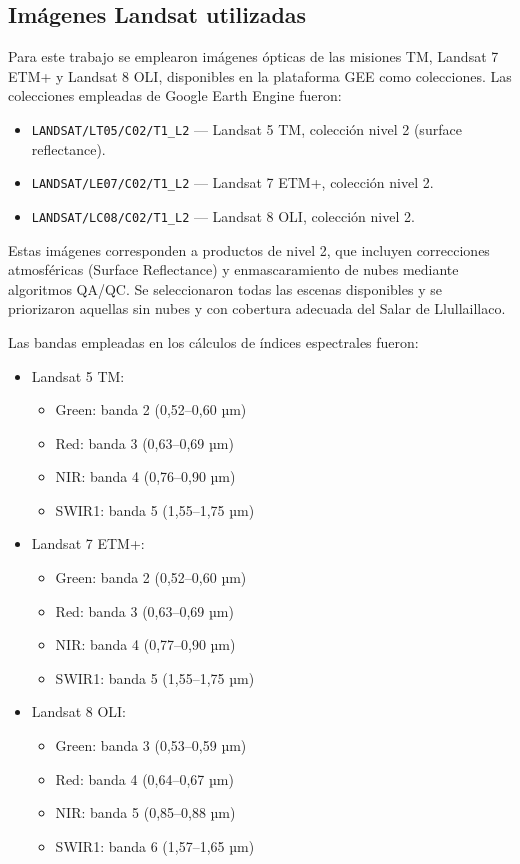 \subsection{Imágenes Landsat utilizadas}

Para este trabajo se emplearon imágenes ópticas de las misiones  TM, Landsat 7 ETM+ y Landsat 8 OLI, disponibles en la plataforma GEE como colecciones. Las colecciones empleadas de Google Earth Engine fueron:

\begin{itemize}
    \item \texttt{LANDSAT/LT05/C02/T1\_L2} — Landsat 5 TM, colección nivel 2 (surface reflectance).
    \item \texttt{LANDSAT/LE07/C02/T1\_L2} — Landsat 7 ETM+, colección nivel 2.
    \item \texttt{LANDSAT/LC08/C02/T1\_L2} — Landsat 8 OLI, colección nivel 2.
\end{itemize}

Estas imágenes corresponden a productos de nivel 2, que incluyen correcciones atmosféricas (Surface Reflectance) y enmascaramiento de nubes mediante algoritmos QA/QC. Se seleccionaron todas las escenas disponibles y se priorizaron aquellas sin nubes y con cobertura adecuada del Salar de Llullaillaco.

Las bandas empleadas en los cálculos de índices espectrales fueron:

\begin{itemize}
    \item Landsat 5 TM:
    \begin{itemize}
        \item Green: banda 2 (0,52–0,60 µm)
        \item Red: banda 3 (0,63–0,69 µm)
        \item NIR: banda 4 (0,76–0,90 µm)
        \item SWIR1: banda 5 (1,55–1,75 µm)
    \end{itemize}
    
    \item Landsat 7 ETM+:
    \begin{itemize}
        \item Green: banda 2 (0,52–0,60 µm)
        \item Red: banda 3 (0,63–0,69 µm)
        \item NIR: banda 4 (0,77–0,90 µm)
        \item SWIR1: banda 5 (1,55–1,75 µm)
    \end{itemize}

    \item Landsat 8 OLI:
    \begin{itemize}
        \item Green: banda 3 (0,53–0,59 µm)
        \item Red: banda 4 (0,64–0,67 µm)
        \item NIR: banda 5 (0,85–0,88 µm)
        \item SWIR1: banda 6 (1,57–1,65 µm)
    \end{itemize}
\end{itemize}


